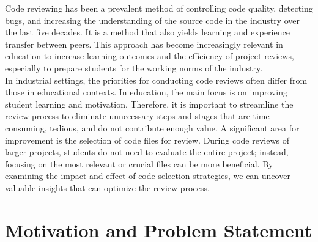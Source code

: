 Code reviewing has been a prevalent method of controlling code quality, detecting bugs, and increasing the understanding of the source code in the industry over the last five decades. It is a method that also yields learning and experience transfer between peers. This approach has become increasingly relevant in education to increase learning outcomes and the efficiency of project reviews, especially to prepare students for the working norms of the industry. \\

In industrial settings, the priorities for conducting code reviews often differ from those in educational contexts. In education, the main focus is on improving student learning and motivation. Therefore, it is important to streamline the review process to eliminate unnecessary steps and stages that are time consuming, tedious, and do not contribute enough value. A significant area for improvement is the selection of code files for review. During code reviews of larger projects, students do not need to evaluate the entire project; instead, focusing on the most relevant or crucial files can be more beneficial. By examining the impact and effect of code selection strategies, we can uncover valuable insights that can optimize the review process.


\section{Motivation and Problem Statement} \label{Motivation}


